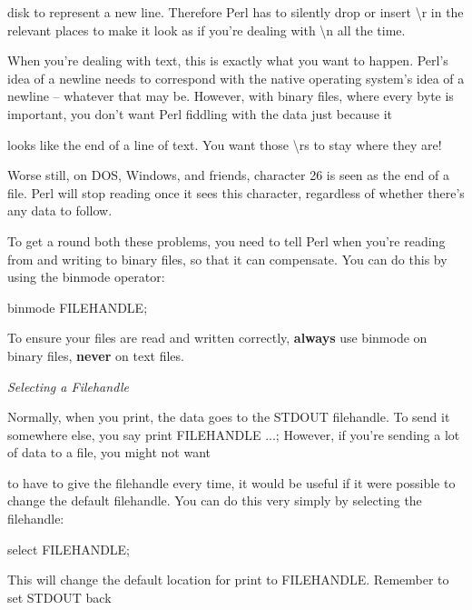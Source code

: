 \documentclass[a4paper,11pt]{book}
\begin{document}
\noindent disk to represent a new line. Therefore Perl has to silently drop or insert \textbackslash r in the relevant places to make it look as if you're dealing with \textbackslash n all the time.

\noindent 

\noindent When you're dealing with text, this is exactly what you want to happen. Perl's idea of a newline needs to correspond with the native operating system's idea of a newline -- whatever that may be. However, with binary files, where every byte is important, you don't want Perl fiddling with the data just because it

\noindent looks like the end of a line of text. You want those \textbackslash rs to stay where they are!

\noindent 

\noindent Worse still, on DOS, Windows, and friends, character 26 is seen as the end of a file. Perl will stop reading once it sees this character, regardless of whether there's any data to follow.

\noindent 

\noindent To get a round both these problems, you need to tell Perl when you're reading from and writing to binary files, so that it can compensate. You can do this by using the binmode operator:

\noindent 

\noindent binmode FILEHANDLE;

\noindent 

\noindent To  ensure  your files are read  and  written  correctly,  \textbf{always  }use binmode on  binary  files,  \textbf{never }on text files.

\noindent 

\noindent \textit{Selecting a Filehandle}

\noindent Normally, when you print, the data goes to the STDOUT filehandle. To send it somewhere else, you say print FILEHANDLE ...; However, if you're sending a lot of data to a file, you might not want

\noindent to have to give the filehandle every time, it would be useful if it were possible to change the default filehandle. You can do this very simply by selecting the filehandle:

\noindent 

\noindent select FILEHANDLE;

\noindent 

\noindent This will  change the default  location  for  print to  FILEHANDLE.  Remember  to  set STDOUT back
\end{document}
